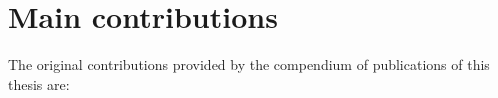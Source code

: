 

\section{Main contributions}

The original contributions provided by the compendium of publications of this thesis are:

